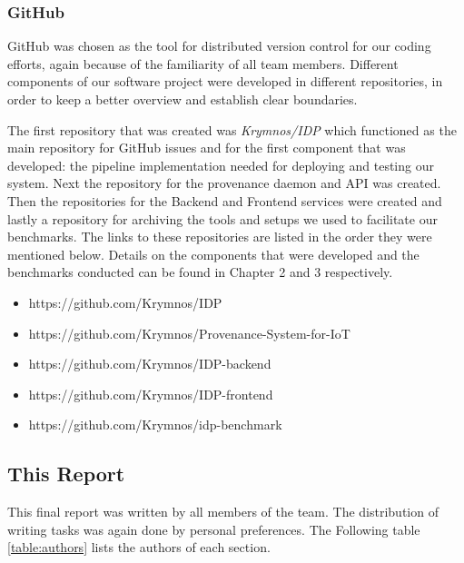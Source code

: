 \subsubsection{GitHub}

GitHub was chosen as the tool for distributed version control for our coding efforts, again because of the familiarity of all team members.
Different components of our software project were developed in different repositories, in order to keep a better overview and establish clear boundaries.

The first repository that was created was \emph{Krymnos/IDP} which functioned as the main repository for GitHub issues and for the first component that was developed: the pipeline implementation needed for deploying and testing our system.
Next the repository for the provenance daemon and API was created.
Then the repositories for the Backend and Frontend services were created and lastly a repository for archiving the tools and setups we used to facilitate our benchmarks.
The links to these repositories are listed in the order they were mentioned below. Details on the components that were developed and the benchmarks conducted can be found in Chapter 2 and 3 respectively.

\begin{itemize}
  \item https://github.com/Krymnos/IDP
  \item https://github.com/Krymnos/Provenance-System-for-IoT
  \item https://github.com/Krymnos/IDP-backend
  \item https://github.com/Krymnos/IDP-frontend
  \item https://github.com/Krymnos/idp-benchmark
\end{itemize}

\subsection{This Report}

This final report was written by all members of the team. 
The distribution of writing tasks was again done by personal preferences. 
The Following table \ref{table:authors} lists the authors of each section.

